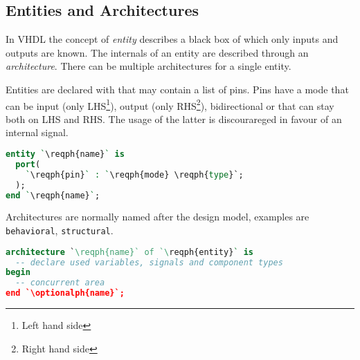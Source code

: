 \subsection{Entities and Architectures}
In VHDL the concept of \emph{entity} describes a black box of which only
inputs and outputs are known. The internals of an entity are described through
an \emph{architecture}. There can be multiple architectures for a single entity.

\begin{center}
  \ttfamily
\end{center}

Entities are declared with  that may contain a list of pins. Pins
have a mode that can be  input (only LHS\footnote{Left hand side}),
 output (only RHS\footnote{Right hand side}), 
bidirectional or  that can stay both on LHS and RHS. The usage of
the latter is discourareged in favour of an internal signal.
\begin{lstlisting}[language=vhdl]
entity `\reqph{name}` is
  port(
    `\reqph{pin}` : `\reqph{mode} \reqph{type}`;
  );
end `\reqph{name}`;
\end{lstlisting}

Architectures are normally named after the design model, examples are
\texttt{behavioral}, \texttt{structural}.
\begin{lstlisting}[language=vhdl]
architecture `\reqph{name}` of `\reqph{entity}` is
  -- declare used variables, signals and component types
begin
  -- concurrent area
end `\optionalph{name}`;
\end{lstlisting}

